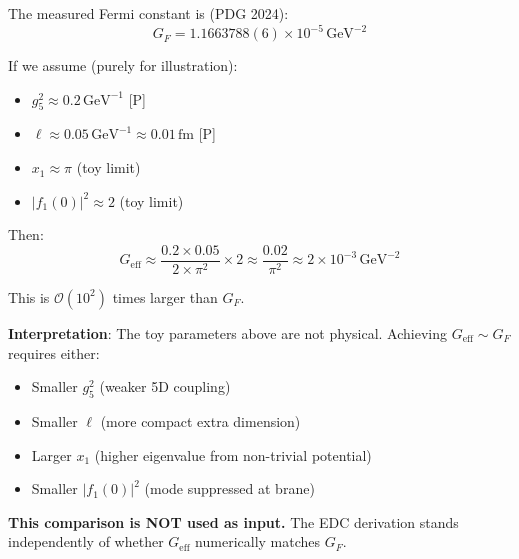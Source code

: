 \begin{tcolorbox}[colback=gray!10!white, colframe=gray!50!black,
    title=\textbf{External Comparison Box --- NOT Used as Input}]

The measured Fermi constant is (PDG 2024):
\begin{equation}
    G_F = 1.1663788(6) \times 10^{-5} \, \text{GeV}^{-2}
\end{equation}

If we assume (purely for illustration):
\begin{itemize}
    \item $g_5^2 \approx 0.2 \, \text{GeV}^{-1}$ [P]
    \item $\ell \approx 0.05 \, \text{GeV}^{-1} \approx 0.01 \, \text{fm}$ [P]
    \item $x_1 \approx \pi$ (toy limit)
    \item $|f_1(0)|^2 \approx 2$ (toy limit)
\end{itemize}

Then:
\begin{equation}
    G_{\text{eff}} \approx \frac{0.2 \times 0.05}{2 \times \pi^2} \times 2
    \approx \frac{0.02}{\pi^2} \approx 2 \times 10^{-3} \, \text{GeV}^{-2}
\end{equation}

This is $\mathcal{O}(10^2)$ times larger than $G_F$.

\textbf{Interpretation}: The toy parameters above are not physical. Achieving
$G_{\text{eff}} \sim G_F$ requires either:
\begin{itemize}
    \item Smaller $g_5^2$ (weaker 5D coupling)
    \item Smaller $\ell$ (more compact extra dimension)
    \item Larger $x_1$ (higher eigenvalue from non-trivial potential)
    \item Smaller $|f_1(0)|^2$ (mode suppressed at brane)
\end{itemize}

\textbf{This comparison is NOT used as input.} The EDC derivation stands
independently of whether $G_{\text{eff}}$ numerically matches $G_F$.

\end{tcolorbox}


